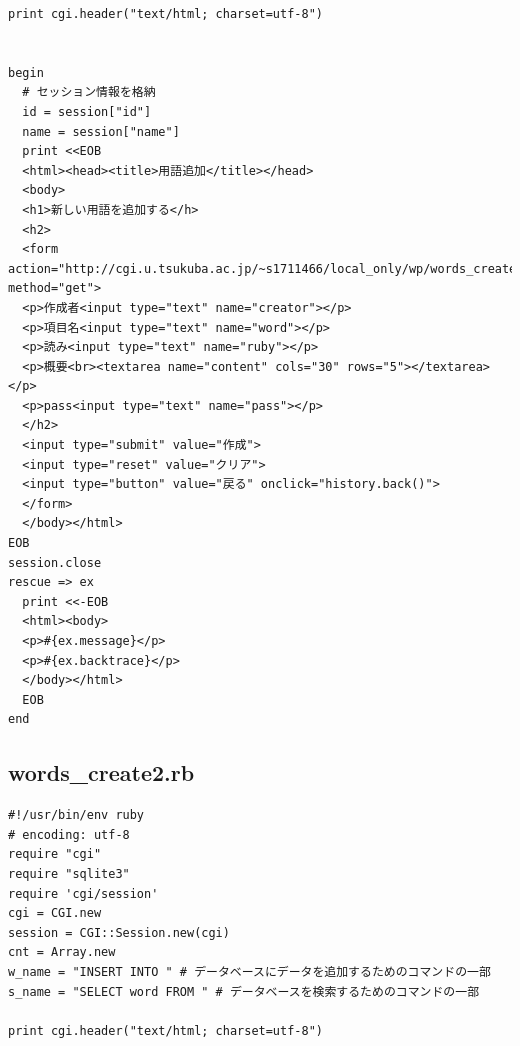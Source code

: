 \documentclass[12pt,a4paper]{jarticle}
\begin{document}
\begin{ttfamily}
\begin{oframed}
\begin{verbatim}
print cgi.header("text/html; charset=utf-8")


begin
  # セッション情報を格納
  id = session["id"]
  name = session["name"]
  print <<EOB
  <html><head><title>用語追加</title></head>
  <body>
  <h1>新しい用語を追加する</h>
  <h2>
  <form action="http://cgi.u.tsukuba.ac.jp/~s1711466/local_only/wp/words_create2.rb" method="get">
  <p>作成者<input type="text" name="creator"></p>
  <p>項目名<input type="text" name="word"></p>
  <p>読み<input type="text" name="ruby"></p>
  <p>概要<br><textarea name="content" cols="30" rows="5"></textarea></p>
  <p>pass<input type="text" name="pass"></p>
  </h2>
  <input type="submit" value="作成">
  <input type="reset" value="クリア">
  <input type="button" value="戻る" onclick="history.back()">
  </form>
  </body></html>
EOB
session.close
rescue => ex
  print <<-EOB
  <html><body>
  <p>#{ex.message}</p>
  <p>#{ex.backtrace}</p>
  </body></html>
  EOB
end
 \end{verbatim}
\end{oframed}

\subsection*{words\_create2.rb}
\begin{oframed}
 \fontsize{8pt}{8pt}\selectfont
 \begin{verbatim}
#!/usr/bin/env ruby
# encoding: utf-8
require "cgi"
require "sqlite3"
require 'cgi/session'
cgi = CGI.new
session = CGI::Session.new(cgi)
cnt = Array.new
w_name = "INSERT INTO " # データベースにデータを追加するためのコマンドの一部
s_name = "SELECT word FROM " # データベースを検索するためのコマンドの一部

print cgi.header("text/html; charset=utf-8")



\end{verbatim}
\end{oframed}
\end{ttfamily}
\end{document}
